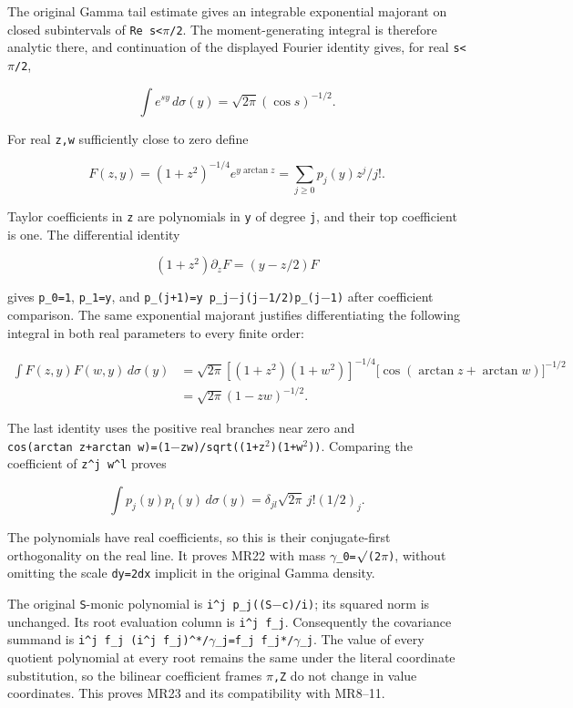 \documentclass[11pt]{article}
\begin{document}
The original Gamma tail estimate gives an integrable exponential majorant on closed subintervals of \texttt{\textbar{}Re\ s\textbar{}\textless{}\ensuremath{\pi}/2}. The moment-generating integral is therefore analytic there, and continuation of the displayed Fourier identity gives, for real \texttt{\textbar{}s\textbar{}\textless{}\ensuremath{\pi}/2},

\[
\int e^{sy}\,d\sigma(y)=\sqrt{2\pi}(\cos s)^{-1/2}.
\]

For real \texttt{z,w} sufficiently close to zero define

\[
F(z,y)=(1+z^2)^{-1/4}e^{y\arctan z}
=\sum_{j\ge0}p_j(y)z^j/j!.
\]

Taylor coefficients in \texttt{z} are polynomials in \texttt{y} of degree \texttt{j}, and their top coefficient is one. The differential identity

\[
(1+z^2)\partial_z F=(y-z/2)F
\]

gives \texttt{p\_0=1}, \texttt{p\_1=y}, and \texttt{p\_(j+1)=y\ p\_j\ensuremath{-}j(j\ensuremath{-}1/2)p\_(j\ensuremath{-}1)} after coefficient comparison. The same exponential majorant justifies differentiating the following integral in both real parameters to every finite order:

\[
\begin{aligned}
\int F(z,y)F(w,y)\,d\sigma(y)
&=\sqrt{2\pi}[(1+z^2)(1+w^2)]^{-1/4}
\bigl[\cos(\arctan z+\arctan w)\bigr]^{-1/2}\\
&=\sqrt{2\pi}(1-zw)^{-1/2}.
\end{aligned}
\]

The last identity uses the positive real branches near zero and \texttt{cos(arctan\ z+arctan\ w)=(1\ensuremath{-}zw)/sqrt((1+z\ensuremath{{}^2})(1+w\ensuremath{{}^2}))}. Comparing the coefficient of \texttt{z\^{}j\ w\^{}l} proves

\[
\int p_j(y)p_l(y)\,d\sigma(y)
=\delta_{jl}\sqrt{2\pi}\,j!(1/2)_j.
\]

The polynomials have real coefficients, so this is their conjugate-first orthogonality on the real line. It proves MR22 with mass \texttt{\ensuremath{\gamma}\_0=\ensuremath{\surd}(2\ensuremath{\pi})}, without omitting the scale \texttt{dy=2dx} implicit in the original Gamma density.

The original \texttt{S}-monic polynomial is \texttt{i\^{}j\ p\_j((S\ensuremath{-}c)/i)}; its squared norm is unchanged. Its root evaluation column is \texttt{i\^{}j\ f\_j}. Consequently the covariance summand is \texttt{i\^{}j\ f\_j\ (i\^{}j\ f\_j)\^{}*/\ensuremath{\gamma}\_j=f\_j\ f\_j*/\ensuremath{\gamma}\_j}. The value of every quotient polynomial at every root remains the same under the literal coordinate substitution, so the bilinear coefficient frames \texttt{\ensuremath{\pi},Z} do not change in value coordinates. This proves MR23 and its compatibility with MR8--11.
\end{document}

